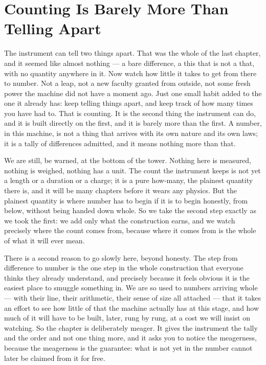 \chapter{Counting Is Barely More Than Telling Apart}

The instrument can tell two things apart. That was the whole of the last chapter, and it seemed like almost
nothing --- a bare difference, a this that is not a that, with no quantity anywhere in it. Now watch how little it
takes to get from there to number. Not a leap, not a new faculty granted from outside, not some fresh power the
machine did not have a moment ago. Just one small habit added to the one it already has: keep telling things
apart, and keep track of how many times you have had to. That is counting. It is the second thing the instrument
can do, and it is built directly on the first, and it is barely more than the first. A number, in this machine,
is not a thing that arrives with its own nature and its own laws; it is a tally of differences admitted, and it
means nothing more than that.

We are still, be warned, at the bottom of the tower. Nothing here is measured, nothing is weighed, nothing has a
unit. The count the instrument keeps is not yet a length or a duration or a charge; it is a pure how-many, the
plainest quantity there is, and it will be many chapters before it wears any physics. But the plainest quantity
is where number has to begin if it is to begin honestly, from below, without being handed down whole. So we take
the second step exactly as we took the first: we add only what the construction earns, and we watch precisely
where the count comes from, because where it comes from is the whole of what it will ever mean.

There is a second reason to go slowly here, beyond honesty. The step from difference to number is the one step in
the whole construction that everyone thinks they already understand, and precisely because it feels obvious it is
the easiest place to smuggle something in. We are so used to numbers arriving whole --- with their line, their
arithmetic, their sense of size all attached --- that it takes an effort to see how little of that the machine
actually has at this stage, and how much of it will have to be built, later, rung by rung, at a cost we will
insist on watching. So the chapter is deliberately meager. It gives the instrument the tally and the order and
not one thing more, and it asks you to notice the meagerness, because the meagerness is the guarantee: what is
not yet in the number cannot later be claimed from it for free.


